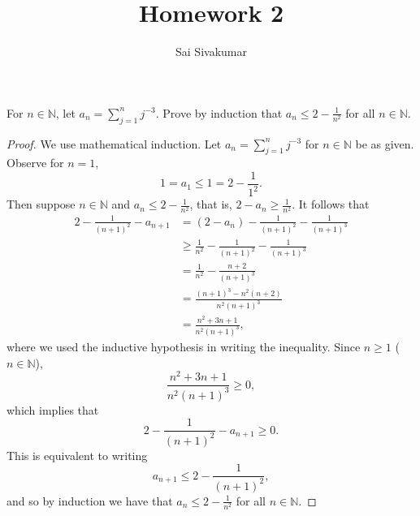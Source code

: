 \documentclass[12pt]{amsart}
\title{Homework 2}
\author{Sai Sivakumar}
\begin{document}
\maketitle

For $n\in \mathbb{N}$, let $a_n = \sum_{j = 1}^n j^{-3}$. Prove by induction that $a_n \leq 2-\frac{1}{n^2}$ for all $n\in\mathbb{N}$.

\begin{proof}
    We use mathematical induction. Let $a_n = \sum_{j = 1}^n j^{-3}$ for $n\in\mathbb{N}$ be as given. Observe for $n = 1$, \[1 = a_1 \leq 1 = 2-\frac{1}{1^2}.\] Then suppose $n\in \mathbb{N}$ and $a_n\leq 2-\frac{1}{n^2}$, that is, $2-a_n \geq \frac{1}{n^2}$. It follows that \begin{align*}
        2-\frac{1}{(n+1)^2}-a_{n+1} &= \left( 2-a_n\right) -\frac{1}{(n+1)^2} - \frac{1}{(n+1)^3} \\
        &\geq \frac{1}{n^2}-\frac{1}{(n+1)^2} - \frac{1}{(n+1)^3} \\
        &= \frac{1}{n^2} - \frac{n+2}{(n+1)^3} \\
        &= \frac{(n+1)^3 - n^2(n+2)}{n^2(n+1)^3} \\
        &= \frac{n^2 + 3n+1}{n^2(n+1)^3},
    \end{align*} where we used the inductive hypothesis in writing the inequality. Since $n\geq 1$ ($n\in\mathbb{N}$), \[\frac{n^2 + 3n+1}{n^2(n+1)^3}\geq 0,\] which implies that \[2-\frac{1}{(n+1)^2}-a_{n+1} \geq 0.\] This is equivalent to writing \[a_{n+1}\leq 2-\frac{1}{(n+1)^2},\] and so by induction we have that $a_n\leq 2-\frac{1}{n^2}$ for all $n\in\mathbb{N}$.
\end{proof}
\end{document}
